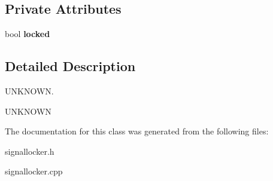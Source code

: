 \subsection*{Private Attributes}
\begin{DoxyCompactItemize}
\item 
\hypertarget{class_signal_locker_a0e96113a0a1a6244d75ec4445096b0ab}{}bool {\bfseries locked}\label{class_signal_locker_a0e96113a0a1a6244d75ec4445096b0ab}

\end{DoxyCompactItemize}


\subsection{Detailed Description}
U\+N\+K\+N\+O\+W\+N. 

U\+N\+K\+N\+O\+W\+N 

The documentation for this class was generated from the following files\+:\begin{DoxyCompactItemize}
\item 
signallocker.\+h\item 
signallocker.\+cpp\end{DoxyCompactItemize}
